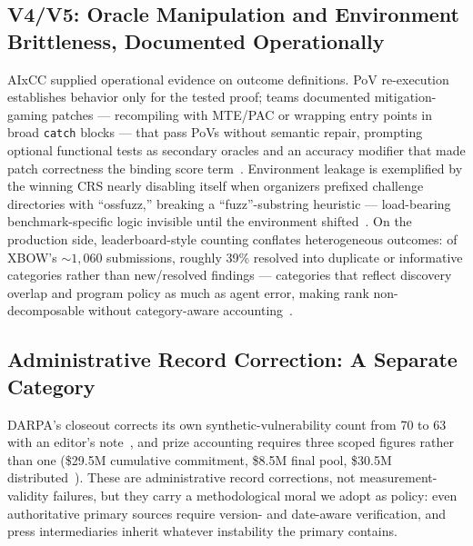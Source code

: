\subsection{V4/V5: Oracle Manipulation and Environment Brittleness, Documented Operationally}
AIxCC supplied operational evidence on outcome definitions. PoV re-execution establishes
behavior only for the tested proof; teams documented mitigation-gaming patches --- recompiling
with MTE/PAC or wrapping entry points in broad \texttt{catch} blocks --- that pass PoVs without
semantic repair, prompting optional functional tests as secondary oracles and an accuracy
modifier that made patch correctness the binding score term~\cite{taafc2025}. Environment
leakage is exemplified by the winning CRS nearly disabling itself when organizers prefixed
challenge directories with ``ossfuzz,'' breaking a ``fuzz''-substring heuristic --- load-bearing
benchmark-specific logic invisible until the environment shifted~\cite{taafc2025}. On the
production side, leaderboard-style counting conflates heterogeneous outcomes: of XBOW's
${\sim}1{,}060$ submissions, roughly 39\% resolved into duplicate or informative categories
rather than new/resolved findings --- categories that reflect discovery overlap and program
policy as much as agent error, making rank non-decomposable without category-aware
accounting~\cite{xbowtop12025}.

\subsection{Administrative Record Correction: A Separate Category}
DARPA's closeout corrects its own synthetic-vulnerability count from 70 to 63 with an editor's
note~\cite{darparesults2025}, and prize accounting requires three scoped figures rather than
one (\$29.5M cumulative commitment, \$8.5M final pool, \$30.5M
distributed~\cite{darpascoring2025,openssfaixcc2026}). These are administrative record
corrections, not measurement-validity failures, but they carry a methodological moral we adopt
as policy: even authoritative primary sources require version- and date-aware verification,
and press intermediaries inherit whatever instability the primary contains.

